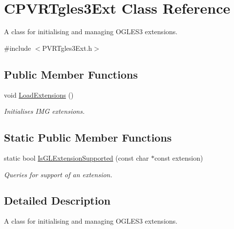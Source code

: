 \hypertarget{class_c_p_v_r_tgles3_ext}{\section{C\+P\+V\+R\+Tgles3\+Ext Class Reference}
\label{class_c_p_v_r_tgles3_ext}
}


A class for initialising and managing O\+G\+L\+E\+S3 extensions.  




{\ttfamily \#include $<$P\+V\+R\+Tgles3\+Ext.\+h$>$}

\subsection*{Public Member Functions}
\begin{DoxyCompactItemize}
\item 
void \hyperlink{class_c_p_v_r_tgles3_ext_a60fca914c6d335e1231ab59f71fb7897}{Load\+Extensions} ()
\begin{DoxyCompactList}\small\item\em Initialises I\+M\+G extensions. \end{DoxyCompactList}\end{DoxyCompactItemize}
\subsection*{Static Public Member Functions}
\begin{DoxyCompactItemize}
\item 
static bool \hyperlink{class_c_p_v_r_tgles3_ext_a1afce0dd6b881d3acd16f604a321595d}{Is\+G\+L\+Extension\+Supported} (const char $\ast$const extension)
\begin{DoxyCompactList}\small\item\em Queries for support of an extension. \end{DoxyCompactList}\end{DoxyCompactItemize}


\subsection{Detailed Description}
A class for initialising and managing O\+G\+L\+E\+S3 extensions. 



 

